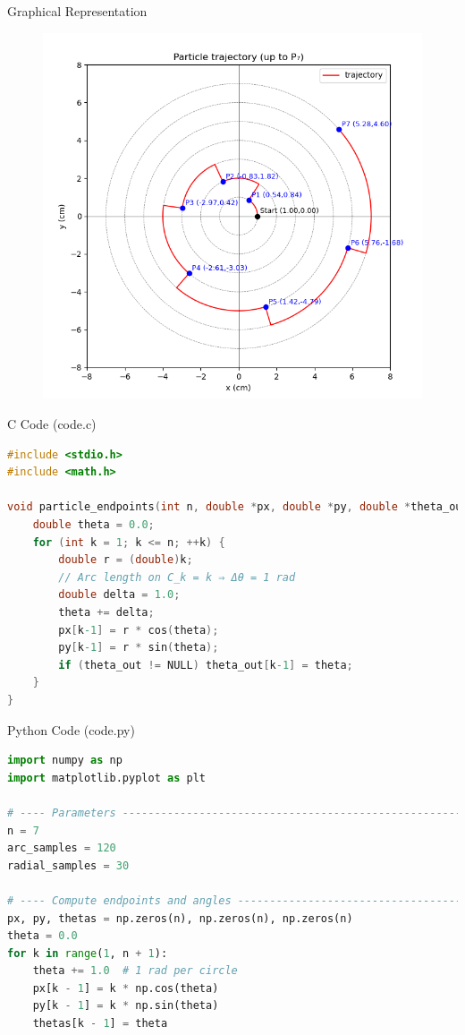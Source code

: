 \documentclass{beamer}
\begin{document}
\begin{frame}{Graphical Representation}
\begin{figure}[h!]
    \centering
    \includegraphics[height=0.5\textheight, keepaspectratio]{figs/fig.png}
    \label{figure_1}
\end{figure}
\end{frame}


\begin{frame}[fragile]{C Code (code.c)}
\begin{lstlisting}[language=C]
#include <stdio.h>
#include <math.h>

void particle_endpoints(int n, double *px, double *py, double *theta_out) {
    double theta = 0.0;
    for (int k = 1; k <= n; ++k) {
        double r = (double)k;
        // Arc length on C_k = k ⇒ Δθ = 1 rad
        double delta = 1.0;
        theta += delta;
        px[k-1] = r * cos(theta);
        py[k-1] = r * sin(theta);
        if (theta_out != NULL) theta_out[k-1] = theta;
    }
}

\end{lstlisting}
\end{frame}

\begin{frame}[fragile]{Python Code (code.py)}
\begin{lstlisting}[language=Python]
import numpy as np
import matplotlib.pyplot as plt

# ---- Parameters ---------------------------------------------------------
n = 7
arc_samples = 120
radial_samples = 30

# ---- Compute endpoints and angles ---------------------------------------
px, py, thetas = np.zeros(n), np.zeros(n), np.zeros(n)
theta = 0.0
for k in range(1, n + 1):
    theta += 1.0  # 1 rad per circle
    px[k - 1] = k * np.cos(theta)
    py[k - 1] = k * np.sin(theta)
    thetas[k - 1] = theta
\end{lstlisting}
\end{frame}
\end{document}
